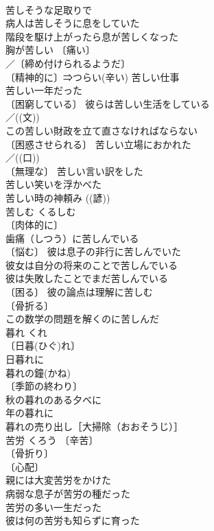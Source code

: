 \documentclass[8pt]{extreport}
\begin{document}
\begin{CJK}{UTF8}{min}
\\	苦しそうな足取りで 
\\	病人は苦しそうに息をしていた 
\\	階段を駆け上がったら息が苦しくなった 
\\	胸が苦しい 〔痛い〕
\\	／〔締め付けられるようだ〕
\\	〔精神的に〕⇒つらい(辛い) 苦しい仕事 
\\	苦しい一年だった 
\\	〔困窮している〕 彼らは苦しい生活をしている 
\\	／((文)) 
\\	この苦しい財政を立て直さなければならない 
\\	〔困惑させられる〕 苦しい立場におかれた 
\\	／((口)) 
\\	〔無理な〕 苦しい言い訳をした 
\\	苦しい笑いを浮かべた 
\\	苦しい時の神頼み ((諺)) 
\\	苦しむ	くるしむ	
\\	〔肉体的に〕
\\	歯痛（しつう）に苦しんでいる 
\\	〔悩む〕 彼は息子の非行に苦しんでいた 
\\	彼女は自分の将来のことで苦しんでいる 
\\	彼は失敗したことでまだ苦しんでいる 
\\	〔困る〕 彼の論点は理解に苦しむ 
\\	〔骨折る〕
\\	この数学の問題を解くのに苦しんだ 
\\	暮れ	くれ	
\\	〔日暮(ひぐ)れ〕
\\	日暮れに 
\\	暮れの鐘(かね) 
\\	〔季節の終わり〕
\\	秋の暮れのある夕べに 
\\	年の暮れに 
\\	暮れの売り出し［大掃除（おおそうじ）］ 
\\	苦労	くろう	〔辛苦〕
\\	〔骨折り〕
\\	〔心配〕
\\	親には大変苦労をかけた 
\\	病弱な息子が苦労の種だった 
\\	苦労の多い一生だった 
\\	彼は何の苦労も知らずに育った 

\end{CJK}
\end{document}
